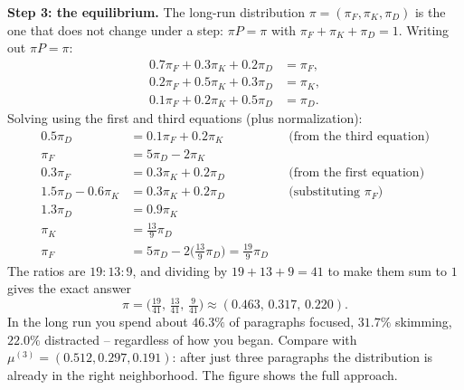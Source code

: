 \textbf{Step 3: the equilibrium.} The long-run distribution $\pi = (\pi_F, \pi_K, \pi_D)$ is
the one that does not change under a step: $\pi P = \pi$ with $\pi_F + \pi_K + \pi_D = 1$.
Writing out $\pi P = \pi$:
\begin{align*}
  0.7\pi_F + 0.3\pi_K + 0.2\pi_D &= \pi_F, \\
  0.2\pi_F + 0.5\pi_K + 0.3\pi_D &= \pi_K, \\
  0.1\pi_F + 0.2\pi_K + 0.5\pi_D &= \pi_D.
\end{align*}
Solving using the first and third equations (plus normalization):
\begin{align*}
  0.5\pi_D &= 0.1\pi_F + 0.2\pi_K &&\text{(from the third equation)} \\
  \pi_F &= 5\pi_D - 2\pi_K \\
  0.3\pi_F &= 0.3\pi_K + 0.2\pi_D &&\text{(from the first equation)} \\
  1.5\pi_D - 0.6\pi_K &= 0.3\pi_K + 0.2\pi_D &&\text{(substituting $\pi_F$)} \\
  1.3\pi_D &= 0.9\pi_K \\
  \pi_K &= \tfrac{13}{9}\pi_D \\
  \pi_F &= 5\pi_D - 2\big(\tfrac{13}{9}\pi_D\big) = \tfrac{19}{9}\pi_D
\end{align*}
The ratios are $19 : 13 : 9$, and dividing by $19 + 13 + 9 = 41$ to make them sum to $1$ gives the exact answer
\[
  \pi = \Big(\tfrac{19}{41},\, \tfrac{13}{41},\, \tfrac{9}{41}\Big)
      \approx (0.463,\, 0.317,\, 0.220).
\]
In the long run you spend about $46.3\%$ of paragraphs focused, $31.7\%$ skimming, $22.0\%$
distracted -- regardless of how you began. Compare with $\mu^{(3)} = (0.512, 0.297, 0.191)$:
after just three paragraphs the distribution is already in the right neighborhood. The figure
shows the full approach.

